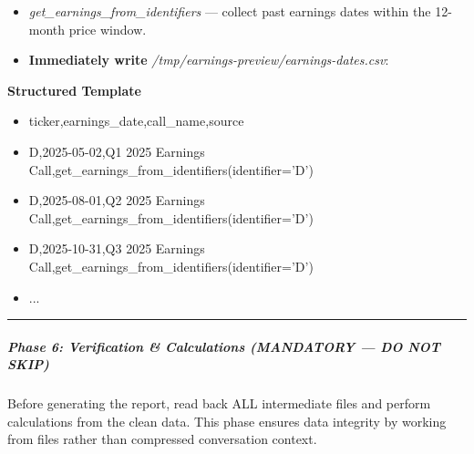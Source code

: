 \documentclass[11pt]{article}
\begin{document}
\begin{itemize}[leftmargin=*,itemsep=2pt,topsep=2pt]
\item {} \emph{get\_\allowbreak{}earnings\_\allowbreak{}from\_\allowbreak{}identifiers} — collect past earnings dates within the 12-month price window.
\item {} \textbf{Immediately write} \emph{/tmp/earnings-preview/earnings-dates.csv}:
\end{itemize}
\textbf{Structured Template}
\begin{itemize}[leftmargin=*,itemsep=2pt,topsep=2pt]
\item {} ticker,earnings\_\allowbreak{}date,call\_\allowbreak{}name,source
\item {} D,2025-05-02,Q1 2025 Earnings Call,get\_\allowbreak{}earnings\_\allowbreak{}from\_\allowbreak{}identifiers(identifier='D')
\item {} D,2025-08-01,Q2 2025 Earnings Call,get\_\allowbreak{}earnings\_\allowbreak{}from\_\allowbreak{}identifiers(identifier='D')
\item {} D,2025-10-31,Q3 2025 Earnings Call,get\_\allowbreak{}earnings\_\allowbreak{}from\_\allowbreak{}identifiers(identifier='D')
\item {} ...
\end{itemize}

\vspace{0.5em}\hrule\vspace{0.5em}

\subparagraph{Phase 6: Verification \& Calculations (MANDATORY — DO NOT SKIP)}\mbox{}\par

Before generating the report, read back ALL intermediate files and perform calculations from the clean data. This phase ensures data integrity by working from files rather than compressed conversation context.
\end{document}
